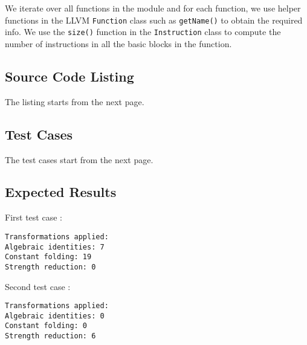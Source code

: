 We iterate over all functions in the module and for each function, we use helper functions in the
LLVM \texttt{Function} class such as \texttt{getName()} to obtain the required info.
We use the \texttt{size()} function in the \texttt{Instruction} class to compute the number of
instructions in all the basic blocks in the function.

\subsection{Source Code Listing}

The listing starts from the next page.



\subsection{Test Cases}

The test cases start from the next page.




\subsection{Expected Results}

First test case :
\begin{verbatim}
Transformations applied:
Algebraic identities: 7
Constant folding: 19
Strength reduction: 0
\end{verbatim}
Second test case :
\begin{verbatim}
Transformations applied:
Algebraic identities: 0
Constant folding: 0
Strength reduction: 6
\end{verbatim}


